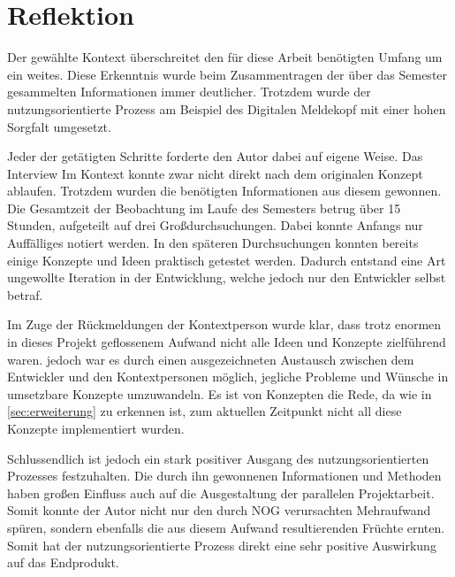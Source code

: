 \section{Reflektion}

Der gewählte Kontext überschreitet den für diese Arbeit benötigten Umfang um ein weites.
Diese Erkenntnis wurde beim Zusammentragen der über das Semester gesammelten Informationen immer deutlicher.
Trotzdem wurde der nutzungsorientierte Prozess am Beispiel des Digitalen Meldekopf mit einer hohen Sorgfalt umgesetzt.

Jeder der getätigten Schritte forderte den Autor dabei auf eigene Weise.
Das Interview Im Kontext konnte zwar nicht direkt nach dem originalen Konzept ablaufen.
Trotzdem wurden die benötigten Informationen aus diesem gewonnen.
Die Gesamtzeit der Beobachtung im Laufe des Semesters betrug über 15 Stunden, aufgeteilt auf drei Großdurchsuchungen.
Dabei konnte Anfangs nur Auffälliges notiert werden.
In den späteren Durchsuchungen konnten bereits einige Konzepte und Ideen praktisch getestet werden.
Dadurch entstand eine Art ungewollte Iteration in der Entwicklung, welche jedoch nur den Entwickler selbst betraf.

Im Zuge der Rückmeldungen der Kontextperson wurde klar, dass trotz enormen in dieses Projekt geflossenem Aufwand nicht alle Ideen und Konzepte zielführend waren.
jedoch war es durch einen ausgezeichneten Austausch zwischen dem Entwickler und den Kontextpersonen möglich, jegliche Probleme und Wünsche in umsetzbare Konzepte umzuwandeln.
Es ist von Konzepten die Rede, da wie in \autoref{sec:erweiterung} zu erkennen ist, zum aktuellen Zeitpunkt nicht all diese Konzepte implementiert wurden.

Schlussendlich ist jedoch ein stark positiver Ausgang des nutzungsorientierten Prozesses festzuhalten.
Die durch ihn gewonnenen Informationen und Methoden haben großen Einfluss auch auf die Ausgestaltung der parallelen Projektarbeit.
Somit konnte der Autor nicht nur den durch NOG verursachten Mehraufwand spüren, sondern ebenfalls die aus diesem Aufwand resultierenden Früchte ernten.
Somit hat der nutzungsorientierte Prozess direkt eine sehr positive Auswirkung auf das Endprodukt.
